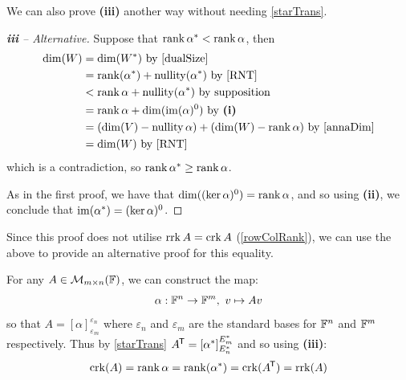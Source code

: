 \documentclass[../main.tex]{subfiles}
\begin{document}
We can also prove \textbf{(iii)} another way without needing \cref{starTrans}.
\begin{proof}[\textbf{iii} -- Alternative]
  Suppose that $\operatorname{rank} \alpha^{*} < \operatorname{rank} \alpha$, then
  \begin{align*}
    \dim(W) &= \dim(W^{*}) \text{ by \cref{dualSize}} \\
            &= \rank(\alpha^{*}) + \nullity(\alpha^{*}) \text{ by \cref{RNT}} \\
            &< \rank \alpha + \nullity(\alpha^{*}) \text{ by supposition} \\
            &= \rank \alpha + \dim(\im(\alpha)^{0}) \text{ by \textbf{(i)}} \\
            &= (\dim(V) - \nullity \alpha) + (\dim(W) - \rank \alpha) \text{ by \cref{annaDim}} \\
            &= \dim(W) \text{ by \cref{RNT}}
  \end{align*}
  which is a contradiction, so $\operatorname{rank} \alpha^{*} \geq \operatorname{rank} \alpha$.

  As in the first proof, we have that $\dim((\ker \alpha)^{0}) = \operatorname{rank} \alpha$, and so using \textbf{(ii)}, we conclude that $\operatorname{im}(\alpha^{*}) = (\ker \alpha)^{0}$.
\end{proof}
\begin{remark}
  Since this proof does not utilise $\operatorname{rrk} A = \operatorname{crk} A$ (\cref{rowColRank}), we can use the above to provide an alternative proof for this equality.

  For any $A \in \mathcal{M}_{m \times n}(\mathbb{F})$, we can construct the map:
  \[
    \alpha: \mathbb{F}^n \to \mathbb{F}^m,\ v \mapsto Av
  \]
  so that $A = [\alpha]^{\varepsilon_n}_{\varepsilon_m}$ where $\varepsilon_n$ and $\varepsilon_m$ are the standard bases for $\mathbb{F}^n$ and $\mathbb{F}^m$ respectively.
  Thus by \cref{starTrans} $A^{{\mkern-1.5mu\mathsf{T}}} = [\alpha^{*}]^{E_m^{*}}_{E_n^{*}}$ and so using \textbf{(iii)}:
  \[
    \operatorname{crk}(A) = \operatorname{rank} \alpha = \operatorname{rank}(\alpha^{*}) = \operatorname{crk}(A^{{\mkern-1.5mu\mathsf{T}}}) = \operatorname{rrk}(A)
  \]
\end{remark}
\end{document}
